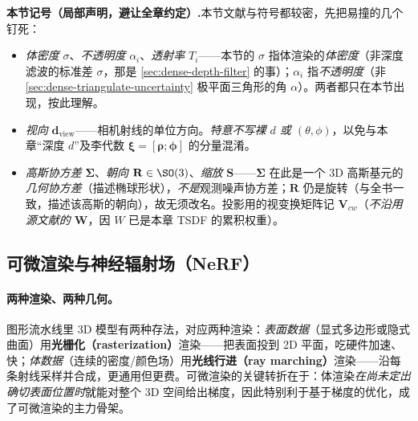 \begin{note}
\textbf{本节记号（局部声明，避让全章约定）.}\;本节文献与符号都较密，先把易撞的几个钉死：
\begin{itemize}
  \item \emph{体密度} $\sigma$、\emph{不透明度} $\alpha_i$、\emph{透射率} $T_i$——本节的 $\sigma$ 指体渲染的\emph{体密度}（非深度滤波的标准差 $\sigma$，那是 \cref{sec:dense-depth-filter} 的事）；$\alpha_i$ 指\emph{不透明度}（非 \cref{sec:dense-triangulate-uncertainty} 极平面三角形的角 $\alpha$）。两者都只在本节出现，按此理解。
  \item \emph{视向} $\mathbf{d}_{\mathrm{view}}$——相机射线的单位方向。\emph{特意不写裸 $d$ 或 $(\theta,\phi)$}，以免与本章“深度 $d$”及李代数 $\boldsymbol{\xi}=[\boldsymbol{\rho};\boldsymbol{\phi}]$ 的分量混淆。
  \item \emph{高斯协方差} $\boldsymbol{\Sigma}$、\emph{朝向} $\mathbf{R}\in\SO(3)$、\emph{缩放} $\mathbf{S}$——$\boldsymbol{\Sigma}$ 在此是一个 3D 高斯基元的\emph{几何协方差}（描述椭球形状），\emph{不是}观测噪声协方差；$\mathbf{R}$ 仍是旋转（与全书一致，描述该高斯的朝向），故无须改名。投影用的视变换矩阵记 $\mathbf{V}_{cw}$（\emph{不沿用源文献的 $\mathbf{W}$}，因 $W$ 已是本章 TSDF 的累积权重）。
\end{itemize}
\end{note}

\subsection{可微渲染与神经辐射场（NeRF）}
\label{sec:dense-radiance-nerf}

\paragraph{两种渲染、两种几何。}
图形流水线里 3D 模型有两种存法，对应两种渲染\cite{mildenhall2020nerf,kerbl2023gaussian}：\emph{表面数据}（显式多边形或隐式曲面）用\textbf{光栅化（rasterization）}渲染——把表面投到 2D 平面，吃硬件加速、快；\emph{体数据}（连续的密度/颜色场）用\textbf{光线行进（ray marching）}渲染——沿每条射线采样并合成，更通用但更费。可微渲染的关键转折在于：体渲染\emph{在尚未定出确切表面位置时}就能对整个 3D 空间给出梯度，因此特别利于基于梯度的优化，成了可微渲染的主力骨架。

